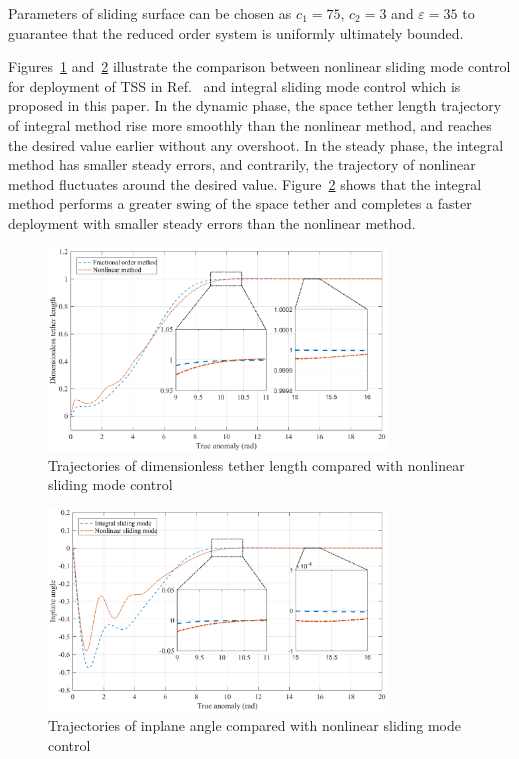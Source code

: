 \documentclass[ShortAfour]{sage}
\theoremstyle{plain}
\theoremstyle{remark}
\begin{document}
Parameters of sliding surface can be chosen as $c_1=75$, $c_2=3$ and $\varepsilon=35$ to guarantee that the reduced order system is uniformly ultimately bounded.
 
Figures~\ref{fig:compare_length} and~\ref{fig:compare_theta} illustrate the comparison between nonlinear sliding mode control for deployment of TSS in Ref.~\cite{Ma2017Pure} and integral sliding mode control which is proposed in this paper. In the dynamic phase, the space tether length trajectory of integral method rise more smoothly than the nonlinear method, and reaches the desired value earlier without any overshoot. In the steady phase, the integral method has smaller steady errors, and contrarily, the trajectory of nonlinear method fluctuates around the desired value. Figure~\ref{fig:compare_theta} shows that the integral method performs a greater swing of the space tether and completes a faster deployment with smaller steady errors than the nonlinear method. 

\begin{figure}[hbtp]
  \centering
  \includegraphics[width=0.8\textwidth]{p9_compare_length.eps}
  \caption{Trajectories of dimensionless tether length compared with nonlinear sliding mode control}
  \label{fig:compare_length}
  \end{figure}
  \begin{figure}[hbtp]
    \centering
    \includegraphics[width=0.8\textwidth]{p9_compare_theta.eps}
    \caption{Trajectories of inplane angle compared with nonlinear sliding mode control}
    \label{fig:compare_theta}
    \end{figure}
\end{document}

